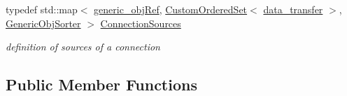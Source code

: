 \begin{DoxyCompactItemize}
typedef std\+::map$<$ \hyperlink{generic__obj_8hpp_acb533b2ef8e0fe72e09a04d20904ca81}{generic\+\_\+obj\+Ref}, \hyperlink{classCustomOrderedSet}{Custom\+Ordered\+Set}$<$ \hyperlink{conn__binding_8hpp_ae44ffa64566f2bb3ce6941833ac940fb}{data\+\_\+transfer} $>$, \hyperlink{classGenericObjSorter}{Generic\+Obj\+Sorter} $>$ \hyperlink{classconn__binding_aa5406c3bf4cee893234c2b0847471f56}{Connection\+Sources}
\begin{DoxyCompactList}\small\item\em definition of sources of a connection \end{DoxyCompactList}\end{DoxyCompactItemize}
\subsection*{Public Member Functions}
